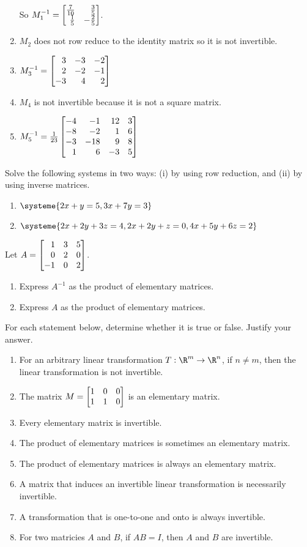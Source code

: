 \begin{exercises}
\begin{problist}
\begin{solution}
\begin{enumerate}
				So $M_{1}^{-1}=\mat{\frac{7}{10}&\frac{3}{5}\\
								 \frac{1}{5}&-\frac{2}{5}\\}$.
				\item $M_{2}$ does not row reduce to the identity matrix so it is not invertible.
				\item $M_{3}^{-1}=\mat{3&-3&-2\\2&-2&-1\\-3&4&2}$
				\item $M_{4}$ is not invertible because it is not a square matrix.
				\item $M_{5}^{-1}=\frac{1}{23}\mat{-4&-1&12&3\\-8&-2&1&6\\-3&-18&9&8\\1&6&-3&5}$
			\end{enumerate}
		\end{solution}

		\prob Solve the following systems in two ways: (i) by using row reduction,
		and (ii) by using inverse matrices.
		\begin{enumerate}
			\item $\systeme{2x+y=5,3x+7y=3}$

			\item $\systeme{2x+2y+3z=4,2x+2y+z=0, 4x+5y+6z=2}$
		\end{enumerate}

		\prob Let $A=\mat{1&3&5\\0&2&0\\-1&0&2}$.
		\begin{enumerate}
			\item Express $A^{-1}$ as the product of elementary matrices.

			\item Express $A$ as the product of elementary matrices.
		\end{enumerate}

		\prob For each statement below, determine whether it is true or false. Justify your answer.
		\begin{enumerate}
			\item For an arbitrary linear transformation $T:\R^{m}\to\R^{n}$,
				if $n \neq m$, then the linear transformation is
				not invertible.
			\item The matrix $M = \mat{1&0&0\\1&1&0}$ is an elementary
				matrix.
			\item Every elementary matrix is invertible.
			\item The product of elementary matrices is sometimes an elementary matrix.
			\item The product of elementary matrices is always an elementary matrix.
			\item A matrix that induces an invertible linear transformation is necessarily invertible.
			\item A transformation that is one-to-one and onto is always invertible.
			\item For two matricies $A$ and $B$, if $AB=I$, then $A$ and $B$ are invertible.
		\end{enumerate}


\end{problist}
\end{exercises}
